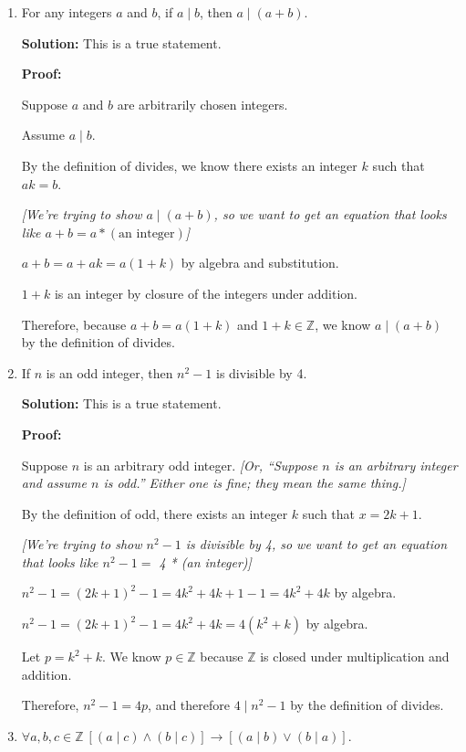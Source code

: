 \documentclass[12pt, letterpaper]{report}
\newcommand{\Z}{\mathbb{Z}}
\begin{document}
\begin{enumerate}

        \item For any integers $a$ and $b$, if $a \mid b$, then $a \mid (a+b)$.  %
        
        \textbf{Solution:} This is a true statement.

\textbf{Proof:}

Suppose $a$ and $b$ are arbitrarily chosen integers.

Assume $a \mid b$.

By the definition of divides, we know there exists an integer $k$ such that $ak=b$.

\textit{[We're trying to show $a \mid (a+b)$, so we want to get an equation that
 looks like  $a+b = a*(\text{an integer})$]}
 
$a + b = a + ak = a(1+k)$ by algebra and substitution.

$1+k$ is an integer by closure of the integers under addition.

Therefore, because $a+b = a(1+k)$ and $1+k \in \Z$, we know $a \mid (a+b)$ by the definition of divides.

        
        \item If $n$ is an odd integer, then $n^2-1$ is divisible by 4.  %
        
        \textbf{Solution:} This is a true statement.

\textbf{Proof:}

Suppose $n$ is an arbitrary odd integer.  \textit{[Or, ``Suppose $n$ is an arbitrary integer
and assume $n$ is odd.''  Either one is fine; they mean the same thing.]}

By the definition of odd, there exists an integer $k$ such that $x=2k+1$.

\textit{[We're trying to show $n^2-1$ is divisible by 4, so we want to get an equation that
 looks like  $n^2-1=$ 4 * (an integer)]}

$n^2-1 = (2k+1)^2-1 = 4k^2 + 4k + 1 - 1 = 4k^2 + 4k$ by algebra.


$n^2-1 = (2k+1)^2-1 = 4k^2 + 4k = 4(k^2+k)$ by algebra.

Let $p=k^2+k$.  We know $p \in \Z$ because $\Z$ is closed under multiplication and addition. 

Therefore, $n^2-1 = 4p$, and therefore $4 \mid n^2-1$ by the definition of divides.

        
        \item $\forall a, b, c \in \Z \ [(a \mid c) \land (b \mid c)] \to [(a \mid b) \lor (b \mid a)]$.  %
        

\end{enumerate}
\end{document}
